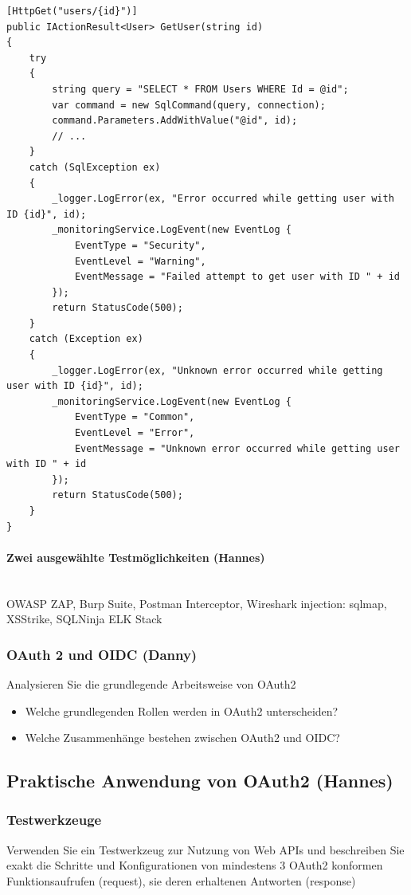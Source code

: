 \documentclass[notitlepage, hidelinks]{article}
\begin{document}
\begin{lstlisting}[language={[Sharp]C},frame=single,caption=Positivbeispiel Improper Assets Management,label=owaspfivegood]
[HttpGet("users/{id}")]
public IActionResult<User> GetUser(string id)
{
    try
    {
        string query = "SELECT * FROM Users WHERE Id = @id";
        var command = new SqlCommand(query, connection);
        command.Parameters.AddWithValue("@id", id);
        // ...
    }
    catch (SqlException ex)
    {
        _logger.LogError(ex, "Error occurred while getting user with ID {id}", id);
        _monitoringService.LogEvent(new EventLog { 
            EventType = "Security",
            EventLevel = "Warning",
            EventMessage = "Failed attempt to get user with ID " + id
        });
        return StatusCode(500);
    }
    catch (Exception ex)
    {
        _logger.LogError(ex, "Unknown error occurred while getting user with ID {id}", id);
        _monitoringService.LogEvent(new EventLog { 
            EventType = "Common",
            EventLevel = "Error",
            EventMessage = "Unknown error occurred while getting user with ID " + id
        });
        return StatusCode(500);
    }
}
\end{lstlisting}

\paragraph{Zwei ausgewählte Testmöglichkeiten (Hannes)} \mbox{} \\
 OWASP ZAP, Burp Suite, Postman Interceptor, Wireshark
 injection: sqlmap, XSStrike, SQLNinja
 ELK Stack
 
\subsubsection{OAuth 2 und OIDC (Danny)}
Analysieren Sie die grundlegende Arbeitsweise von OAuth2
\begin{itemize}
\item Welche grundlegenden Rollen werden in OAuth2 unterscheiden?
\item Welche Zusammenhänge bestehen zwischen OAuth2 und OIDC?
\end{itemize}

\subsection{Praktische Anwendung von OAuth2 (Hannes)}
\subsubsection{Testwerkzeuge}
Verwenden Sie ein Testwerkzeug zur Nutzung von Web APIs und beschreiben Sie exakt die Schritte und Konfigurationen von mindestens 3 OAuth2 konformen Funktionsaufrufen (request), sie deren erhaltenen Antworten (response)
\end{document}
